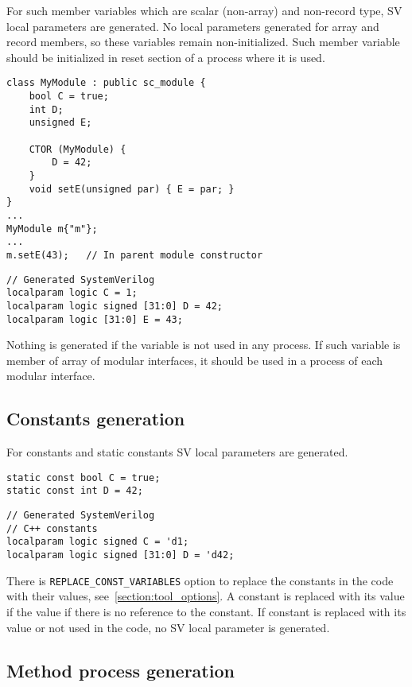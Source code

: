 For such member variables which are scalar (non-array) and non-record type, SV local parameters are generated. 
No local parameters generated for array and record members, so these variables remain non-initialized. Such member variable should be initialized in reset section of a process where it is used.

\begin{lstlisting}[style=mycpp]
class MyModule : public sc_module {
  	bool C = true;
	int D;
   	unsigned E;

	CTOR (MyModule) {
   		D = 42;
	}
	void setE(unsigned par) { E = par; }
}
...
MyModule m{"m"};
...
m.setE(43);   // In parent module constructor
\end{lstlisting}
%
\begin{lstlisting}[style=myverilog]
// Generated SystemVerilog
localparam logic C = 1;
localparam logic signed [31:0] D = 42;
localparam logic [31:0] E = 43;
\end{lstlisting}

Nothing is generated if the variable is not used in any process. If such variable is member of array of modular interfaces, it should be used in a process of each modular interface.

\subsection{Constants generation}\label{section:const_gen}

For constants and static constants SV local parameters are generated.

\begin{lstlisting}[style=mycpp]
static const bool C = true;
static const int D = 42;
\end{lstlisting}
%
\begin{lstlisting}[style=myverilog]
// Generated SystemVerilog
// C++ constants
localparam logic signed C = 'd1;
localparam logic signed [31:0] D = 'd42;
\end{lstlisting}

There is {\tt REPLACE\_CONST\_VARIABLES} option to replace the constants in the code with their values, see~\ref{section:tool_options}. A constant is replaced with its value if the value if there is no reference to the constant. If constant is replaced with its value or not used in the code, no SV local parameter is generated.

\subsection{Method process generation}\label{section:method_gen}

